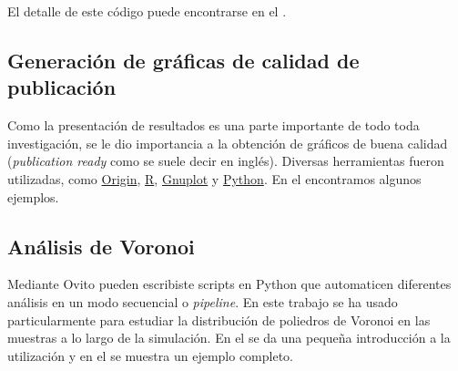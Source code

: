 El detalle de este código puede encontrarse en el  .

\subsection{Generación de gráficas de calidad de publicación}

Como la presentación de resultados es una parte importante de todo toda investigación, se le dio importancia a la obtención de gráficos de buena calidad (\textit{publication ready} como se suele decir en inglés). Diversas herramientas fueron utilizadas, como \href{http://www.originlab.com}{Origin}, \href{https://www.r-project.org/}{R}, \href{http://www.gnuplot.info/}{Gnuplot} y \href{https://www.python.org/}{Python}. En el   encontramos algunos ejemplos.

\subsection{Análisis de Voronoi}

Mediante Ovito \citep{stukowski10} pueden escribiste scripts en Python que automaticen diferentes análisis en un modo secuencial o \textit{pipeline}. En este trabajo se ha usado particularmente para estudiar la distribución de poliedros de Voronoi en las muestras a lo largo de la simulación. En el  se da una pequeña introducción a la utilización y en el   se muestra un ejemplo completo.